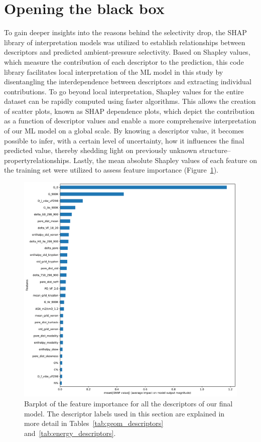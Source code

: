 \documentclass[main]{subfiles}
\begin{document}
\section{Opening the black box}

To gain deeper insights into the reasons behind the selectivity drop, the SHAP library of interpretation models\autocite{SHAP,molnar2020interpretable} was utilized to establish relationships between descriptors and predicted ambient-pressure selectivity. Based on Shapley values\autocite{shapley1953value}, which measure the contribution of each descriptor to the prediction, this code library facilitates local interpretation of the ML model in this study by disentangling the interdependence between descriptors and extracting individual contributions. To go beyond local interpretation, Shapley values for the entire dataset can be rapidly computed using faster algorithms.\autocite{SHAP} This allows the creation of scatter plots, known as SHAP dependence plots, which depict the contribution as a function of descriptor values and enable a more comprehensive interpretation of our ML model on a global scale. By knowing a descriptor value, it becomes possible to infer, with a certain level of uncertainty, how it influences the final predicted value, thereby shedding light on previously unknown structure--propertyrelationships. Lastly, the mean absolute Shapley values of each feature on the training set were utilized to assess feature importance (Figure~\ref{fgr:featimp_shap}).

\begin{figure}[ht]
  \centering
    \includegraphics[width=0.70\linewidth]{figures/4-ml/SI_figure/Feature_importance_shapbased.pdf}
    \caption{Barplot of the feature importance for all the descriptors of our final model. The descriptor labels used in this section are explained in more detail in Tables~\ref{tab:geom_descriptors} and~\ref{tab:energy_descriptors}.}\label{fgr:featimp_shap}
  \end{figure}
\end{document}
